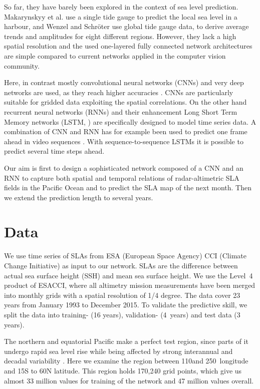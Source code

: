 \documentclass{article}
\begin{document}
So far, they have barely been explored in the context of sea level prediction.
Makarynskyy et al. \cite{harbor} use a single tide gauge to predict the local sea level in a harbour, and Wenzel and Schr\"oter \cite{c10} use global tide gauge data, to derive average trends and amplitudes for eight different regions. However, they lack a high spatial resolution and the used one-layered fully connected network architectures are simple compared to current networks applied in the computer vision community.

Here, in contrast mostly convolutional neural networks (CNNs) and very deep networks are used, as they reach higher accuracies \cite{c22}. CNNs are particularly suitable for gridded data exploiting the spatial correlations. On the other hand recurrent neural networks (RNNs) and their enhancement Long Short Term Memory networks (LSTM, \cite{c11}) are specifically designed to model time series data. A combination of CNN and RNN has for example been used to predict one frame ahead in video sequences \cite{s18}. With sequence-to-sequence LSTMs \cite{s23} it is possible to predict several time steps ahead.

Our aim is first to design a sophisticated network composed of a CNN and an RNN to capture both spatial and temporal relations of radar-altimetric SLA fields in the Pacific Ocean and to predict the SLA map of the next month. Then we extend the prediction length to several years.

\section{Data}
\label{sec:pagestyle}

We use time series of SLAs from ESA (European Space \linebreak Agency) CCI (Climate Change Initiative) \cite{c1} as input to our network. SLAs are the difference between actual sea surface height (SSH) and mean sea surface height. We use the Level~4 product of ESACCI, where all altimetry mission measurements have been merged into monthly grids with a spatial resolution of 1/4 degree. The data cover 23 years from \mbox{January} 1993 to December 2015. To validate the predictive skill, we split the data into training- (16 years), validation- (4~years) and test data (3 years).

The northern and equatorial Pacific make a perfect test region, since parts of it undergo rapid sea level rise while being affected by strong interannual and decadal variability \cite{riet}. Here we examine the region between 110\degree and 250\degree ~longitude and 15\degree S to 60\degree N latitude.
This region holds 170,240 grid points, which give us almost 33 million values for training of the network and 47 million values overall.
\end{document}
